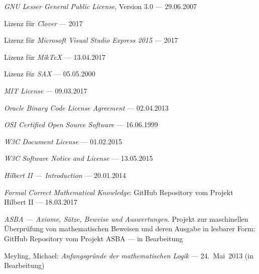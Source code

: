 \begin{flushleft}
\begin{thebibliography}{12}
		 \emph{GNU Lesser General Public License}, Version 3.0
		--- 29.06.2007

		 Lizenz für \emph{Clover}
		--- 2017

		 Lizenz
		für \emph{Microsoft Visual Studio Express 2015}
		--- 2017

		 Lizenz für \emph{MikTeX}
		--- 13.04.2017

		 Lizenz für \emph{SAX}
		--- 05.05.2000

		 \emph{MIT License}
		--- 09.03.2017

		 \emph{Oracle Binary Code License Agreement}
		--- 02.04.2013

		 \emph{OSI Certified Open Source Software}
		--- 16.06.1999

		 \emph{W3C Document License}
		--- 01.02.2015

		 \emph{W3C Software Notice and License}
		--- 13.05.2015

		 \emph{Hilbert II --- Introduction}
		--- 20.01.2014

		 \emph{Formal Correct Mathematical Knowledge}:
		GitHub Repository vom Projekt Hilbert II
		--- 18.03.2017

		 \emph{ASBA --- Axiome, Sätze, Beweise und Auswertungen}.
		Projekt zur maschinellen Überprüfung von mathematischen Beweisen
		und deren Ausgabe in lesbarer Form:
		GitHub Repository vom Projekt ASBA
		--- in Bearbeitung

		 Meyling, Michael:
		\emph{Anfangsgründe der mathematischen Logik}
		--- 24.~Mai~2013 (in Bearbeitung)


\end{thebibliography}
\end{flushleft}
